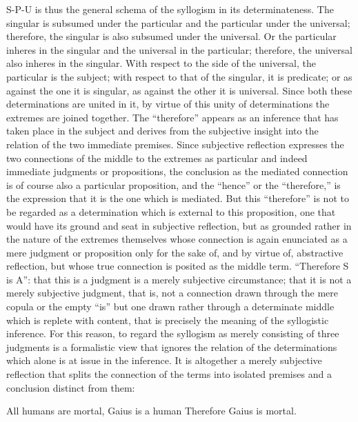S-P-U is thus the general schema of
the syllogism in its determinateness.
The singular is subsumed under the particular
and the particular under the universal;
therefore, the singular is also subsumed under the universal.
Or the particular inheres in the singular
and the universal in the particular;
therefore, the universal also inheres in the singular.
With respect to the side of the universal,
the particular is the subject;
with respect to that of the singular, it is predicate;
or as against the one it is singular,
as against the other it is universal.
Since both these determinations are united in it,
by virtue of this unity of determinations
the extremes are joined together.
The “therefore” appears as an inference
that has taken place in the subject
and derives from the subjective insight
into the relation of the two immediate premises.
Since subjective reflection expresses
the two connections of the middle
to the extremes as particular
and indeed immediate judgments or propositions,
the conclusion as the mediated connection is
of course also a particular proposition,
and the “hence” or the “therefore,” is
the expression that it is the one which is mediated.
But this “therefore” is not to be regarded
as a determination which is external to this proposition,
one that would have its ground and seat in subjective reflection,
but as grounded rather in the nature of the extremes themselves
whose connection is again enunciated as
a mere judgment or proposition only for the sake of,
and by virtue of, abstractive reflection,
but whose true connection is posited as the middle term.
“Therefore S is A”:
that this is a judgment is a merely subjective circumstance;
that it is not a merely subjective judgment,
that is, not a connection drawn through
the mere copula or the empty “is”
but one drawn rather through a determinate middle
which is replete with content,
that is precisely the meaning of the syllogistic inference.
For this reason, to regard the syllogism as
merely consisting of three judgments is
a formalistic view that ignores
the relation of the determinations
which alone is at issue in the inference.
It is altogether a merely subjective reflection
that splits the connection of
the terms into isolated premises
and a conclusion distinct from them:

All humans are mortal,
Gaius is a human
Therefore Gaius is mortal.

